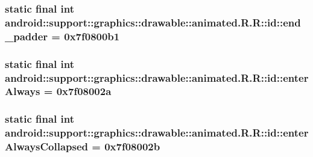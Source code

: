 \hypertarget{classandroid_1_1support_1_1graphics_1_1drawable_1_1animated_1_1_r_1_1id_00367d31ae4e25c273aa594c722ed55d}{
\subsubsection[{end\_\-padder}]{\setlength{\rightskip}{0pt plus 5cm}static final int android::support::graphics::drawable::animated.R.R::id::end\_\-padder = 0x7f0800b1}}
\label{classandroid_1_1support_1_1graphics_1_1drawable_1_1animated_1_1_r_1_1id_00367d31ae4e25c273aa594c722ed55d}


\hypertarget{classandroid_1_1support_1_1graphics_1_1drawable_1_1animated_1_1_r_1_1id_1158bb64da31b3fa318f6778b24e5ab3}{
\subsubsection[{enterAlways}]{\setlength{\rightskip}{0pt plus 5cm}static final int android::support::graphics::drawable::animated.R.R::id::enterAlways = 0x7f08002a}}
\label{classandroid_1_1support_1_1graphics_1_1drawable_1_1animated_1_1_r_1_1id_1158bb64da31b3fa318f6778b24e5ab3}


\hypertarget{classandroid_1_1support_1_1graphics_1_1drawable_1_1animated_1_1_r_1_1id_ec05e0b809c824514a8655f821e920d0}{
\subsubsection[{enterAlwaysCollapsed}]{\setlength{\rightskip}{0pt plus 5cm}static final int android::support::graphics::drawable::animated.R.R::id::enterAlwaysCollapsed = 0x7f08002b}}
\label{classandroid_1_1support_1_1graphics_1_1drawable_1_1animated_1_1_r_1_1id_ec05e0b809c824514a8655f821e920d0}


